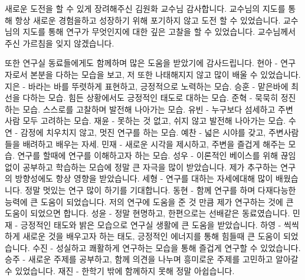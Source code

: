 \documentclass[master,english,final]{postech-ucs}
\begin{document}
\begin{summarykorean}
    
\end{summarykorean}






\acknowledgement[korean]
새로운 도전을 할 수 있게 장려해주신 김원화 교수님 감사합니다. 교수님의 지도를 통해 항상 새로운 경험을하고 성장하기 위해 포기하지 않고 도전 할 수 있었습니다.
교수님의 지도를 통해 연구가 무엇인지에 대한 깊은 고찰을 할 수 있었습니다. 교수님께서 주신 가르침을 잊지 않겠습니다.

또한 연구실 동료들에게도 함께하며 많은 도움을 받았기에 감사드립니다.
현아 - 연구자로서 본분을 다하는 모습을 보고, 저 또한 나태해지지 않고 많이 배울 수 있었습니다.
지은 - 바라는 바를 뚜렷하게 표현하고, 긍정적으로 노력하는 모습.
승훈 - 맡은바에 최선을 다하는 모습. 힘든 상황에서도 긍정적인 태도로 대하는 모습.
준혁 - 묵묵히 정진하는 모습. 스스로를 고찰하며 발전해 나아가는 모습.
유빈 - 누구보다 섬세하고 주변 사람 모두 고려하는 모습.
재윤 - 못하는 것 없고, 쉬지 않고 발전해 나아가는 모습.
수연 - 감정에 치우치지 않고, 멋진 연구를 하는 모습.
예찬 - 넓은 시야를 갖고, 주변사람들을 배려하고 배우는 자세.
민재 - 새로운 시각을 제시하고, 주변을 즐겁게 해주는 모습. 연구를 할때에 연구를 이해하고자 하는 모습.
성우 - 이론적인 베이스를 위해 끊임 없이 공부하고 학습하는 모습에 정말 큰 자극을 많이 받았습니다. 제가 추구하는 연구의 방향성에도 항상 영향을 받았습니다.
세형 - 연구를 대하는 자세에대해 많이 배웠습니다. 정말 멋있는 연구 많이 하기를 기대합니다.
동현 - 함께 연구를 하며 다재다능한 능력에 큰 도움이 되었습니다. 저의 연구에 도움을 준 것 만큼 제가 연구하는 것에 큰 도움이 되었으면 합니다.
성윤 - 정말 현명하고, 한편으로는 선배같은 동료였습니다. 
민재 - 긍정적인 태도와 밝은 모습으로 연구실 생활에 큰 도움을 받았습니다.
하영 - 씩씩하게 새로운 것을 배우고자 하는 태도, 긍정적인 에너지를 통해 힘들때 큰 도움이 되었습니다.
수진 - 성실하고 쾌활하게 연구하는 모습을 통해 즐겁게 연구할 수 있었습니다.
승주 - 새로운 주제를 공부하고, 함께 의견을 나누며 흥미로운 주제를 고민하고 알아갈 수 있었습니다.
재진 - 한학기 밖에 함께하지 못해 정말 아쉽습니다.
\curriculumvitae[english]
\end{document}
